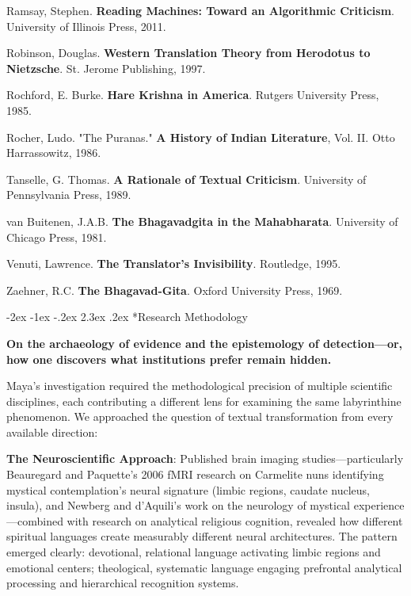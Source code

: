 \documentclass[12pt,twoside]{book}
\makeatletter
\def\cleardoublepage{\clearpage\if@twoside \ifodd\c@page\else\hbox{}\thispagestyle{empty}\newpage\if@twocolumn\hbox{}\newpage\fi\fi\fi}
\renewcommand\section{\@startsection{section}{1}{\z@}%
{-2ex \@plus -1ex \@minus -.2ex}%
{2.3ex \@plus.2ex}%
{\normalfont\Large\bfseries}}
\makeatother
\begin{document}
Ramsay, Stephen. \textbf{Reading Machines: Toward an Algorithmic Criticism}. University of Illinois Press, 2011.

Robinson, Douglas. \textbf{Western Translation Theory from Herodotus to Nietzsche}. St. Jerome Publishing, 1997.

Rochford, E. Burke. \textbf{Hare Krishna in America}. Rutgers University Press, 1985.

Rocher, Ludo. "The Puranas." \textbf{A History of Indian Literature}, Vol. II. Otto Harrassowitz, 1986.

Tanselle, G. Thomas. \textbf{A Rationale of Textual Criticism}. University of Pennsylvania Press, 1989.

van Buitenen, J.A.B. \textbf{The Bhagavadgita in the Mahabharata}. University of Chicago Press, 1981.

Venuti, Lawrence. \textbf{The Translator's Invisibility}. Routledge, 1995.

Zaehner, R.C. \textbf{The Bhagavad-Gita}. Oxford University Press, 1969.

\cleardoublepage
\section*{Research Methodology}
\thispagestyle{sectionopening}

\textbf{On the archaeology of evidence and the epistemology of detection—or, how one discovers what institutions prefer remain hidden.}

Maya's investigation required the methodological precision of multiple scientific disciplines, each contributing a different lens for examining the same labyrinthine phenomenon. We approached the question of textual transformation from every available direction:

\textbf{\textbf{The Neuroscientific Approach}}: Published brain imaging studies—particularly Beauregard and Paquette's 2006 fMRI research on Carmelite nuns identifying mystical contemplation's neural signature (limbic regions, caudate nucleus, insula), and Newberg and d'Aquili's work on the neurology of mystical experience—combined with research on analytical religious cognition, revealed how different spiritual languages create measurably different neural architectures. The pattern emerged clearly: devotional, relational language activating limbic regions and emotional centers; theological, systematic language engaging prefrontal analytical processing and hierarchical recognition systems.
\end{document}

